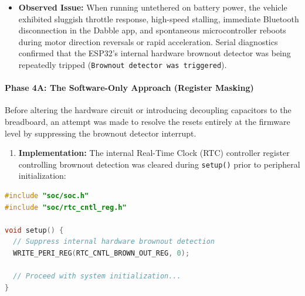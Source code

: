 \documentclass[journal,12pt,onecolumn]{IEEEtran}
\begin{document}
\begin{itemize}
	\item \textbf{Observed Issue:} When running untethered on battery power, the vehicle exhibited sluggish throttle response, high-speed stalling, immediate Bluetooth disconnection in the Dabble app, and spontaneous microcontroller reboots during motor direction reversals or rapid acceleration. %
	Serial diagnostics confirmed that the ESP32's internal hardware brownout detector was being repeatedly tripped (\texttt{Brownout detector was triggered}). %
\end{itemize}

\paragraph*{\textbf{Phase 4A: The Software-Only Approach (Register Masking)}}
Before altering the hardware circuit or introducing decoupling capacitors to the breadboard, an attempt was made to resolve the resets entirely at the firmware level by suppressing the brownout detector interrupt. %
\begin{enumerate}
	\item \textbf{Implementation:} The internal Real-Time Clock (RTC) controller register controlling brownout detection was cleared during \texttt{setup()} prior to peripheral initialization: %
\end{enumerate}

\begin{lstlisting}[language=C++, caption={Suppressing Hardware Brownout Detection via RTC Register}]
#include "soc/soc.h"
#include "soc/rtc_cntl_reg.h"

void setup() {
  // Suppress internal hardware brownout detection
  WRITE_PERI_REG(RTC_CNTL_BROWN_OUT_REG, 0);
  
  // Proceed with system initialization...
}
\end{lstlisting}
\end{document}
